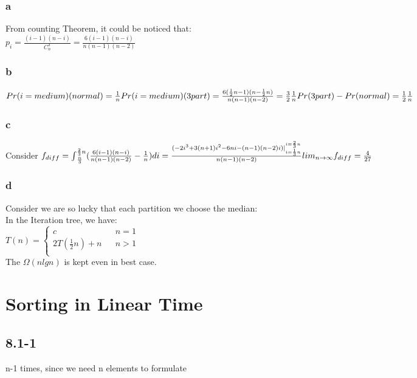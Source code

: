 \documentclass[]{article}
\begin{document}
\subsubsection{a}
From counting Theorem, it could be noticed that:\\
$p_{i} = \frac{(i-1)(n-i)}{C_{n}^{3}} = \frac{6(i-1)(n-i)}{n(n-1)(n-2)}$

\subsubsection{b}
$Pr(i = medium) (normal) = \frac{1}{n}\\
Pr(i = medium) (3part) = \frac{6(\frac{1}{2}n-1)(n-\frac{1}{2}n)}{n(n-1)(n-2)} = \frac{3}{2}\frac{1}{n}\\
Pr(3part) - Pr(normal) = \frac{1}{2}\frac{1}{n}$

\subsubsection{c}
Consider $f_{diff}= {\int }_{\frac{n}{3}}^{\frac{2}{3}n} (\frac{6(i-1)(n-i)}{n(n-1)(n-2)} - \frac{1}{n})di\\
 = \frac{(-2i^3 + 3(n+1)i^2 - 6ni - (n-1)(n-2)i)|_{i = \frac{1}{3}n}^{i = \frac{2}{3}n}}{n(n-1)(n-2)}\\
{lim}_{n\to \infty} f_{diff} = \frac{4}{27}$

\subsubsection{d}
Consider we are so lucky that each partition we choose the median:\\
In the Iteration tree, we have:\\
$ T(n)=\left\{
\begin{array}{lcl}
c       &      & {n = 1}\\
2T(\frac{1}{2}n) + n     &      & {n > 1}\\
\end{array} \right. $\\
The $\Omega(nlgn)$ is kept even in best case.

\section{Sorting in Linear Time}
\subsection{8.1-1}
n-1 times, since we need n elements to formulate
\end{document}
